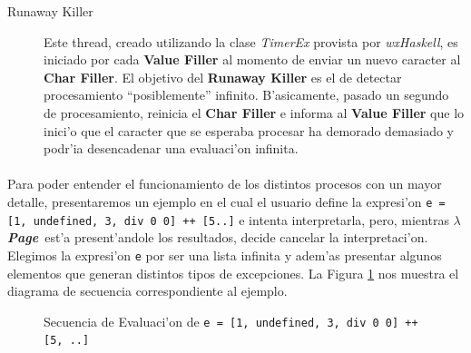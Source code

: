 \documentclass[a4paper]{article}
\newcommand{\hpage}{\textbf{\textsl{$\lambda$Page}}}
\begin{document}
\begin{description}
	\item[Runaway Killer] Este thread, creado utilizando la clase \textsl{TimerEx} provista por \textsl{wxHaskell}, es iniciado por cada \textbf{Value Filler} al momento de enviar un nuevo caracter al \textbf{Char Filler}.  El objetivo del \textbf{Runaway Killer} es el de detectar procesamiento ``posiblemente'' infinito.  B'asicamente, pasado un segundo de procesamiento, reinicia el \textbf{Char Filler} e informa al \textbf{Value Filler} que lo inici'o que el caracter que se esperaba procesar ha demorado demasiado y podr'ia desencadenar una evaluaci'on infinita.
\end{description}
\paragraph{}Para poder entender el funcionamiento de los distintos procesos con un mayor detalle, presentaremos un ejemplo en el cual el usuario define la expresi'on \texttt{e = [1, undefined, 3, div 0 0] ++ [5..]} e intenta interpretarla, pero, mientras \hpage\ est'a present'andole los resultados, decide cancelar la interpretaci'on.  Elegimos la expresi'on \texttt{e} por ser una lista infinita y adem'as presentar algunos elementos que generan distintos tipos de excepciones.  La Figura \ref{seq1} nos muestra el diagrama de secuencia correspondiente al ejemplo.
\begin{figure}[hp]
	\begin{center}
		\caption{Secuencia de Evaluaci'on de \texttt{e = [1, undefined, 3, div 0 0] ++ [5, ..]}}
		\label{seq1}
	\end{center}
\end{figure}
\end{document}
